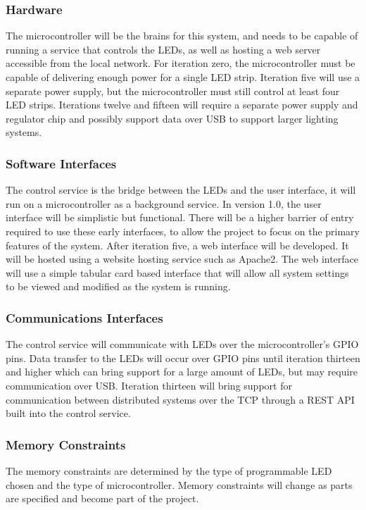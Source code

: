 \documentclass[onecolumn, draftclsnofoot,10pt, compsoc]{IEEEtran}
\begin{document}
			\subsubsection{Hardware}
				The microcontroller will be the brains for this system, and needs to be capable of running a service that controls the LEDs, as well as hosting a web server accessible from the local network.
				For iteration zero, the microcontroller must be capable of delivering enough power for a single LED strip. Iteration five will use a separate power supply, but the microcontroller must still control
				at least four LED strips. Iterations twelve and fifteen will require a separate power supply and regulator chip and possibly support data over USB to support larger lighting systems.
			\subsubsection{Software Interfaces}
				The control service is the bridge between the LEDs and the user interface, it will run on a microcontroller as a background service.
				In version 1.0, the user interface will be simplistic but functional. There will be a higher barrier of entry required to use these early interfaces, to allow the project to focus on the primary features of the system.
				After iteration five, a web interface will be developed. It will be hosted using a website hosting service such as Apache2. The web interface will use a simple tabular card based interface
				that will allow all system settings to be viewed and modified as the system is running.

			\subsubsection{Communications Interfaces}
				The control service will communicate with LEDs over the microcontroller's GPIO pins. Data transfer to the LEDs will occur over GPIO pins until iteration thirteen and higher which can bring support for a
				large amount of LEDs, but may require communication over USB.
				Iteration thirteen will bring support for communication between distributed systems over the TCP through a REST API built into the control service.
			\subsubsection{Memory Constraints}
				The memory constraints are determined by the type of programmable LED chosen and the type of microcontroller. Memory constraints will change as parts are specified and become part of the project.
\end{document}
